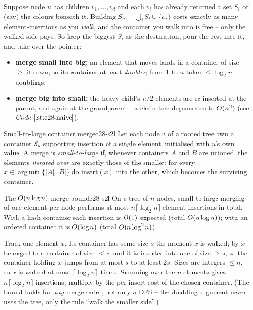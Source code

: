 Suppose node \(u\) has children \(v_1,\dots,v_d\) and each \(v_i\) has already
returned a set \(S_i\) of (say) the colours beneath it.  Building
\(S_u=\bigcup_i S_i\cup\{c_u\}\) costs exactly as many element-insertions as
you \emph{walk}, and the container you walk into is free -- only the walked
side pays.  So keep the biggest \(S_i\) as the destination, pour the rest into
it, and take over the pointer:

\begin{itemize}[nosep,leftmargin=1.4em]
  \item \textbf{merge small into big:} an element that moves lands in a
        container of size \(\ge\) its own, so its container at least
        \emph{doubles}; from \(1\) to \(n\) takes \(\le\log_2 n\) doublings.
  \item \textbf{merge big into small:} the heavy child's \(n/2\) elements are
        re-inserted at the parent, and again at the grandparent -- a chain
        tree degenerates to \(O(n^2)\) (see \(\coderef{c28-naive}\)).
\end{itemize}

\begin{definition}{Small-to-large container merge}{c28-s2l}
Let each node \(u\) of a rooted tree own a container \(S_u\) supporting
insertion of a single element, initialised with \(u\)'s own value.  A merge is
\emph{small-to-large} if, whenever containers \(A\) and \(B\) are unioned, the
elements \emph{iterated over} are exactly those of the smaller: for every
\(x\in\operatorname{arg\,min}\{|A|,|B|\}\) do \(\text{insert}(x)\) into the other, which
becomes the surviving container.  \end{definition}

\begin{theorem}{The \(O(n\log n)\) merge bound}{c28-s2l}
On a tree of \(n\) nodes, small-to-large merging of one element per node
performs at most \(n\lceil\log_2 n\rceil\) element-insertions in total.  With
a hash container each insertion is \(O(1)\) expected (total
\(O(n\log n)\)); with an ordered container it is \(O(\log n)\) (total
\(O(n\log^2 n)\)).
\end{theorem}
\begin{proofbox}
Track one element \(x\).  Its container has some size \(s\) the moment \(x\) is
walked; by  \(x\) belonged to a container of size \(\le s\),
and it is inserted into one of size \(\ge s\), so the container holding \(x\)
jumps from at most \(s\) to at least \(2s\).  Sizes are integers \(\le n\), so
\(x\) is walked at most \(\lceil\log_2 n\rceil\) times.  Summing over the \(n\)
elements gives \(n\lceil\log_2 n\rceil\) insertions; multiply by the per-insert
cost of the chosen container.  (The bound holds for \emph{any} merge order, not
only a DFS -- the doubling argument never uses the tree, only the rule
``walk the smaller side''.)
\end{proofbox}

